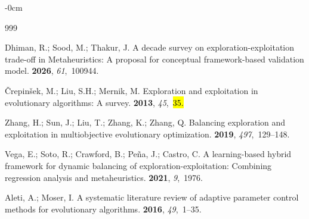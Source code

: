 \documentclass[mathematics,article,accept,moreauthors]{Definitions/mdpi}
\begin{document}


\begin{adjustwidth}{-\extralength}{0cm}



\begin{thebibliography}{999}

Dhiman, R.; Sood, M.; Thakur, J.
\newblock A decade survey on exploration-exploitation trade-off in
  Metaheuristics: A proposal for conceptual framework-based validation model.
 {\bf 2026}, {\em 61},~100944.

{\v{C}}repin{\v{s}}ek, M.; Liu, S.H.; Mernik, M.
\newblock Exploration and exploitation in evolutionary algorithms: A survey.
 {\bf 2013}, {\em 45},~\hl{35.} %


Zhang, H.; Sun, J.; Liu, T.; Zhang, K.; Zhang, Q.
\newblock Balancing exploration and exploitation in multiobjective evolutionary
  optimization.
 {\bf 2019}, {\em 497},~129--148.

Vega, E.; Soto, R.; Crawford, B.; Pe{\~n}a, J.; Castro, C.
\newblock A learning-based hybrid framework for dynamic balancing of
  exploration-exploitation: Combining regression analysis and metaheuristics.
 {\bf 2021}, {\em 9},~1976.

Aleti, A.; Moser, I.
\newblock A systematic literature review of adaptive parameter control methods
  for evolutionary algorithms.
 {\bf 2016}, {\em 49},~1--35.


\end{thebibliography}
\end{adjustwidth}
\end{document}
